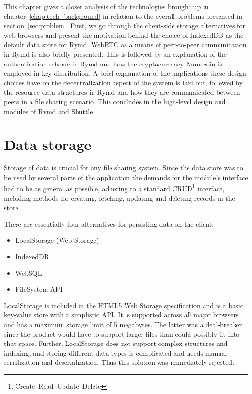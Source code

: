 This chapter gives a closer analysis of the technologies brought up in chapter~\ref{chap:tech_background} in relation to the overall problems presented in section~\ref{sec:problem}. First, we go through the client-side storage alternatives for web browsers and present the motivation behind the choice of IndexedDB as the default data store for Rymd. WebRTC as a means of peer-to-peer communication in Rymd is also briefly presented. This is followed by an explanation of the authentication scheme in Rymd and how the cryptocurrency Namecoin is employed in key distribution. A brief explanation of the implications these design choices have on the decentralization aspect of the system is laid out, followed by the resource data structures in Rymd and how they are communicated between peers in a file sharing scenario. This concludes in the high-level design and modules of Rymd and Shuttle.


\section{Data storage}
\label{sec:datastorage}
Storage of data is crucial for any file sharing system. Since the data store was to be used by several parts of the application the demands for the module's interface had to be as general as possible, adhering to a standard CRUD\footnote{Create–Read–Update–Delete} interface, including methods for creating, fetching, updating and deleting records in the store.

There are essentially four alternatives for persisting data on the client:

\begin{itemize}
\item LocalStorage (Web Storage)
\item IndexedDB
\item WebSQL
\item FileSystem API
\end{itemize}

LocalStorage is included in the HTML5 Web Storage specification \cite{WebStorage:Online} and is a basic key-value store with a simplistic API. It is supported across all major browsers and has a maximum storage limit of 5 megabytes. The latter was a deal-breaker since the product would have to support larger files than could possibly fit into that space. Further, LocalStorage does not support complex structures and indexing, and storing different data types is complicated and needs manual serialization and deserialization. Thus this solution was immediately rejected.

